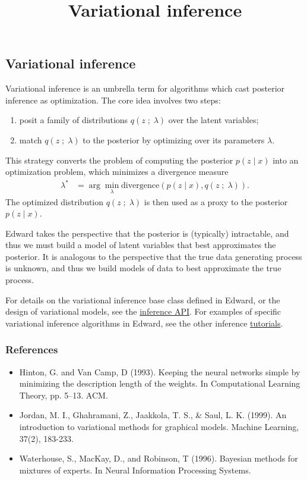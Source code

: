 \title{Variational inference}

\subsection{Variational inference}

Variational inference is an umbrella term for algorithms which cast
posterior inference as optimization. The core idea involves two steps:
\begin{enumerate}
   \item posit a family of distributions $q(z\;;\;\lambda)$ over the
   latent variables;
   \item match $q(z\;;\;\lambda)$ to the posterior by optimizing over its
   parameters $\lambda$.
 \end{enumerate}
This strategy converts the problem of computing the posterior $p(z \mid x)$ into
an optimization problem, which minimizes a divergence measure
\begin{align*}
  \lambda^*
  &=
  \arg\min_\lambda \text{divergence}(
  p(z \mid x)
  ,
  q(z\;;\;\lambda)
  ).
\end{align*}
The optimized distribution $q(z\;;\;\lambda)$ is then used as a
proxy to the posterior $p(z\mid x)$.

Edward takes the perspective that the posterior is (typically)
intractable, and thus we must build a model of latent variables that
best approximates the posterior.
It is analogous to the perspective
that the true data generating process is unknown, and thus we build
models of data to best approximate the true process.

For details on the variational inference base class defined in Edward,
or the design of variational models, see the
\href{api/inferences.html}{inference API}.
For examples of specific variational inference algorithms in
Edward, see the other inference \href{tutorials.html}{tutorials}.

\subsubsection{References}\label{references}

\begin{itemize}
\item
  Hinton, G. and Van Camp, D (1993). Keeping the neural networks
  simple by minimizing the description length of the weights. In
  Computational Learning Theory, pp. 5–13. ACM.
\item
  Jordan, M. I., Ghahramani, Z., Jaakkola, T. S., & Saul, L. K.
  (1999). An introduction to variational methods for graphical models.
  Machine Learning, 37(2), 183-233.
\item
  Waterhouse, S., MacKay, D., and Robinson, T (1996). Bayesian methods
  for mixtures of experts. In Neural Information Processing Systems.
\end{itemize}
